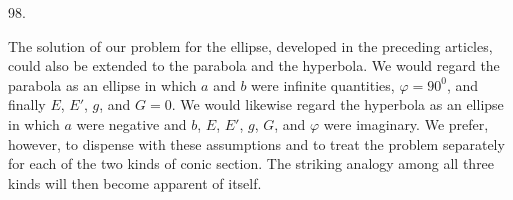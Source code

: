 \par{}\medskip
{}
\begin{center}98.\end{center}
The solution of our problem for the ellipse, developed in the preceding articles, could also be extended to the parabola and the hyperbola. We would regard the parabola as an ellipse in which $a$ and $b$ were infinite quantities, $\varphi=90^0$, and finally $E$, $E'$, $g$, and $G=0$. We would likewise regard the hyperbola as an ellipse in which $a$ were negative and $b$, $E$, $E'$, $g$, $G$, and $\varphi$ were imaginary. We prefer, however, to dispense with these assumptions and to treat the problem separately for each of the two kinds of conic section. The striking analogy among all three kinds will then become apparent of itself.

